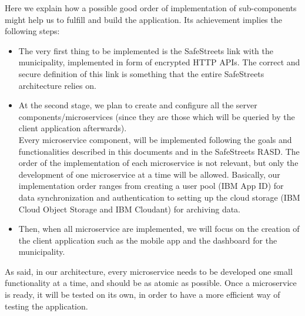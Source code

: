 Here we explain how a possible good order of implementation of sub-components might help us to fulfill and build the application. Its achievement implies the following steps:
\begin{itemize}
	\item The very first thing to be implemented is the SafeStreets link with the municipality, implemented in form of encrypted HTTP APIs. The correct and secure definition of this link is something that the entire SafeStreets architecture relies on.
	\item At the second stage, we plan to create and configure all the server components/microservices (since they are those which will be queried by the client application afterwards).
	\\Every microservice component, will be implemented following the goals and functionalities described in this documents and in the SafeStreets RASD. The order of the implementation of each microservice is not relevant, but only the development of one microservice at a time will be allowed.
	Basically, our implementation order ranges from creating a user pool (IBM App ID) for data synchronization and authentication to setting up the cloud storage (IBM Cloud Object Storage and IBM Cloudant) for archiving data. 
	\item Then, when all microservice are implemented, we will focus on the creation of the client application such as the mobile app and the dashboard for the municipality.
\end{itemize}

As said, in our architecture, every microservice needs to be developed one small functionality at a time, and should be as atomic as possible. Once a microservice is ready, it will be tested on its own, in order to have a more efficient way of testing the application.
